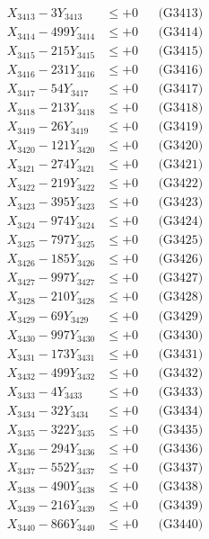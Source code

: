 \documentclass[a4paper,10pt]{article}
\begin{document}
{\begin{align}
X_{3413} - 3Y_{3413} &\leq +0 && \text{(G3413)} \\
X_{3414} - 499Y_{3414} &\leq +0 && \text{(G3414)} \\
X_{3415} - 215Y_{3415} &\leq +0 && \text{(G3415)} \\
X_{3416} - 231Y_{3416} &\leq +0 && \text{(G3416)} \\
X_{3417} - 54Y_{3417} &\leq +0 && \text{(G3417)} \\
X_{3418} - 213Y_{3418} &\leq +0 && \text{(G3418)} \\
X_{3419} - 26Y_{3419} &\leq +0 && \text{(G3419)} \\
X_{3420} - 121Y_{3420} &\leq +0 && \text{(G3420)} \\
\allowbreak
X_{3421} - 274Y_{3421} &\leq +0 && \text{(G3421)} \\
X_{3422} - 219Y_{3422} &\leq +0 && \text{(G3422)} \\
X_{3423} - 395Y_{3423} &\leq +0 && \text{(G3423)} \\
X_{3424} - 974Y_{3424} &\leq +0 && \text{(G3424)} \\
X_{3425} - 797Y_{3425} &\leq +0 && \text{(G3425)} \\
X_{3426} - 185Y_{3426} &\leq +0 && \text{(G3426)} \\
X_{3427} - 997Y_{3427} &\leq +0 && \text{(G3427)} \\
X_{3428} - 210Y_{3428} &\leq +0 && \text{(G3428)} \\
X_{3429} - 69Y_{3429} &\leq +0 && \text{(G3429)} \\
X_{3430} - 997Y_{3430} &\leq +0 && \text{(G3430)} \\
\allowbreak
X_{3431} - 173Y_{3431} &\leq +0 && \text{(G3431)} \\
X_{3432} - 499Y_{3432} &\leq +0 && \text{(G3432)} \\
X_{3433} - 4Y_{3433} &\leq +0 && \text{(G3433)} \\
X_{3434} - 32Y_{3434} &\leq +0 && \text{(G3434)} \\
X_{3435} - 322Y_{3435} &\leq +0 && \text{(G3435)} \\
X_{3436} - 294Y_{3436} &\leq +0 && \text{(G3436)} \\
X_{3437} - 552Y_{3437} &\leq +0 && \text{(G3437)} \\
X_{3438} - 490Y_{3438} &\leq +0 && \text{(G3438)} \\
X_{3439} - 216Y_{3439} &\leq +0 && \text{(G3439)} \\
X_{3440} - 866Y_{3440} &\leq +0 && \text{(G3440)} \\

\end{align}}
\end{document}
